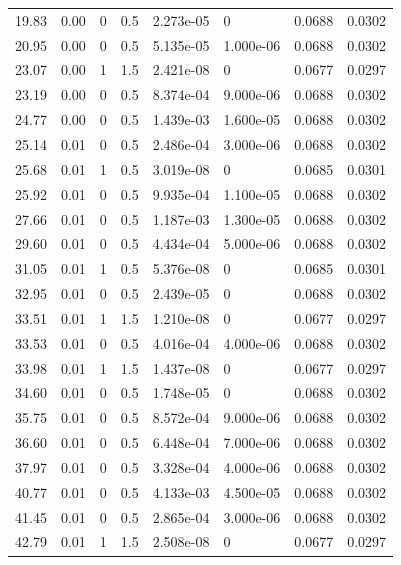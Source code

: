 \documentclass[preview]{standalone}
\begin{document}
{{\begin{tabular}{L{1.2cm}C{1.2cm} C{0.3cm}C{0.5cm} C{1.4cm}C{1.4cm} C{1.4cm}C{1.4cm}}
  19.83  &  0.00  & 0     & 0.5 &  2.273e-05  & 0  & 0.0688 &  0.0302   \\ 
  20.95  &  0.00  & 0     & 0.5 &  5.135e-05  & 1.000e-06  & 0.0688 &  0.0302   \\ 
  23.07  &  0.00  & 1     & 1.5 &  2.421e-08  & 0  & 0.0677 &  0.0297   \\ 
  23.19  &  0.00  & 0     & 0.5 &  8.374e-04  & 9.000e-06  & 0.0688 &  0.0302   \\ 
  24.77  &  0.00  & 0     & 0.5 &  1.439e-03  & 1.600e-05  & 0.0688 &  0.0302   \\ 
  25.14  &  0.01  & 0     & 0.5 &  2.486e-04  & 3.000e-06  & 0.0688 &  0.0302   \\ 
  25.68  &  0.01  & 1     & 0.5 &  3.019e-08  & 0  & 0.0685 &  0.0301   \\ 
  25.92  &  0.01  & 0     & 0.5 &  9.935e-04  & 1.100e-05  & 0.0688 &  0.0302   \\ 
  27.66  &  0.01  & 0     & 0.5 &  1.187e-03  & 1.300e-05  & 0.0688 &  0.0302   \\ 
  29.60  &  0.01  & 0     & 0.5 &  4.434e-04  & 5.000e-06  & 0.0688 &  0.0302   \\ 
  31.05  &  0.01  & 1     & 0.5 &  5.376e-08  & 0  & 0.0685 &  0.0301   \\ 
  32.95  &  0.01  & 0     & 0.5 &  2.439e-05  & 0  & 0.0688 &  0.0302   \\ 
  33.51  &  0.01  & 1     & 1.5 &  1.210e-08  & 0  & 0.0677 &  0.0297   \\ 
  33.53  &  0.01  & 0     & 0.5 &  4.016e-04  & 4.000e-06  & 0.0688 &  0.0302   \\ 
  33.98  &  0.01  & 1     & 1.5 &  1.437e-08  & 0  & 0.0677 &  0.0297   \\ 
  34.60  &  0.01  & 0     & 0.5 &  1.748e-05  & 0  & 0.0688 &  0.0302   \\ 
  35.75  &  0.01  & 0     & 0.5 &  8.572e-04  & 9.000e-06  & 0.0688 &  0.0302   \\ 
  36.60  &  0.01  & 0     & 0.5 &  6.448e-04  & 7.000e-06  & 0.0688 &  0.0302   \\ 
  37.97  &  0.01  & 0     & 0.5 &  3.328e-04  & 4.000e-06  & 0.0688 &  0.0302   \\ 
  40.77  &  0.01  & 0     & 0.5 &  4.133e-03  & 4.500e-05  & 0.0688 &  0.0302   \\ 
  41.45  &  0.01  & 0     & 0.5 &  2.865e-04  & 3.000e-06  & 0.0688 &  0.0302   \\ 
  42.79  &  0.01  & 1     & 1.5 &  2.508e-08  & 0  & 0.0677 &  0.0297   \\ 

\end{tabular}}}
\end{document}
